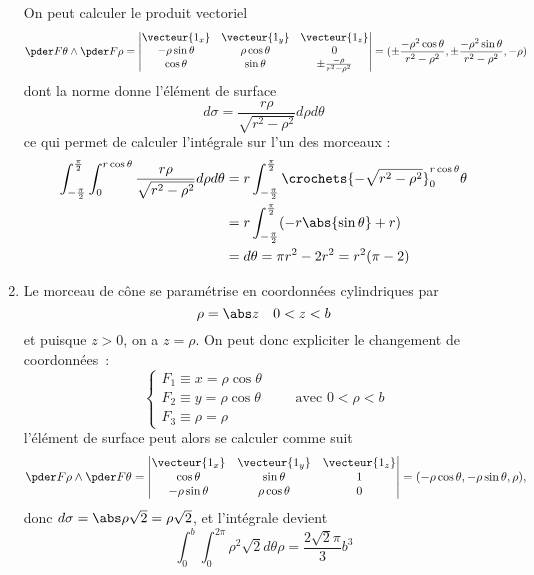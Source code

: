 \begin{enumerate}
On peut calculer le produit vectoriel
\begin{equation*}
\pder F \theta \wedge \pder F \rho =
\begin{vmatrix}
\vecteur{1_x} & \vecteur{1_y} & \vecteur{1_z}\\
-\rho\sin\theta & \rho\cos\theta & 0\\
\cos\theta & \sin\theta & \pm \frac{-\rho}{r^2-\rho^2}
\end{vmatrix} = (\pm\frac{-\rho^2 \cos\theta}{r^2-\rho^2}, \pm
\frac{- \rho^2 \sin\theta}{r^2-\rho^2}, -\rho)
\end{equation*}
dont la norme donne l'élément de surface
\begin{equation*}
d \sigma = \frac{r \rho}{\sqrt{r^2-\rho^2}} d \rho d \theta
\end{equation*}
ce qui permet de calculer l'intégrale sur l'un des morceaux :
\begin{equation*}
\begin{split}
\int_{-\frac\pi2}^{\frac\pi2} \int_0^{r\cos\theta}\frac{r
\rho}{\sqrt{r^2-\rho^2}} d \rho d \theta %
&= r \int_{-\frac\pi2}^{\frac\pi2} \crochets{- \sqrt{r^2-\rho^2}}_0^{r\cos\theta} \theta\\
&= r \int_{-\frac\pi2}^{\frac\pi2} (- r \abs{\sin\theta} + r)\\
	&=d\theta = \pi r^2 - 2 r^2 = r^2 (\pi - 2)
\end{split}
\end{equation*}

\item Le morceau de cône se paramétrise en coordonnées cylindriques
par
\begin{equation*}
\rho = \abs z \quad 0 < z < b
\end{equation*}
et puisque $z > 0$, on a $z = \rho$. On peut donc expliciter le
changement de coordonnées~:
\begin{equation*}
\begin{cases}
F_1 \equiv x = \rho \cos \theta\\
F_2 \equiv y = \rho \cos \theta\\
F_3 \equiv \rho = \rho
\end{cases} \qquad \text{avec $0 < \rho < b$}
\end{equation*}
l'élément de surface peut alors se calculer comme suit
\begin{equation*}
\pder F \rho \wedge \pder F \theta = %
\begin{vmatrix}
\vecteur{1_x} & \vecteur{1_y} & \vecteur{1_z}\\
\cos\theta & \sin\theta & 1\\
-\rho \sin\theta & \rho \cos \theta & 0
\end{vmatrix} = (- \rho \cos\theta, - \rho \sin\theta, \rho),
\end{equation*}
donc $d\sigma = \abs \rho \sqrt2 = \rho \sqrt 2$, et l'intégrale devient
\begin{equation*}
\int_0^b \int_0^{2\pi} \rho^2 \sqrt 2 d \theta \rho = \frac {2\sqrt2
\pi}3 b^3
\end{equation*}


\end{enumerate}
